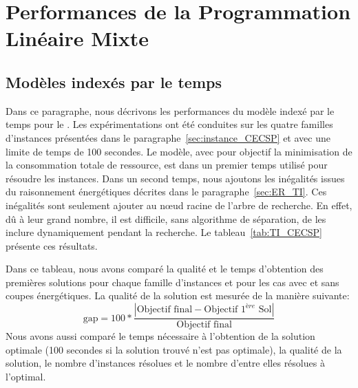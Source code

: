 \section{Performances de la Programmation Linéaire Mixte}

\subsection{Modèles indexés par le temps}
Dans ce paragraphe, nous décrivons les performances du modèle indexé
par le temps pour le \CECSP. Les expérimentations ont été conduites
sur les quatre familles d'instances présentées dans le
paragraphe~\ref{sec:instance_CECSP} et avec une limite de temps de 100
secondes. Le modèle, avec pour objectif la minimisation de la
consommation totale de ressource, est dans un premier temps utilisé
pour résoudre les instances. Dans un second temps, nous ajoutons les
inégalités issues du raisonnement énergétiques décrites dans le
paragraphe~\ref{sec:ER_TI}. Ces inégalités sont seulement ajouter au
n\oe ud racine de l'arbre de recherche. En effet, dû à leur grand
nombre, il est difficile, sans algorithme de séparation, de les
inclure dynamiquement pendant la recherche. Le
tableau~\ref{tab:TI_CECSP} présente ces résultats.

Dans ce tableau, nous avons comparé la qualité et le temps d'obtention
des premières solutions pour chaque famille d'instances et pour les
cas avec et sans coupes énergétiques. La qualité de la solution est
mesurée de la manière suivante: 
\[
  \text{gap}=100*\frac{|\text{Objectif final} - \text{Objectif } 1^{ère} \text{  Sol}|}{\text{Objectif final}}
\]
Nous avons aussi comparé le temps nécessaire à l'obtention de la
solution optimale (100 secondes si la solution trouvé n'est pas
optimale), la qualité de la solution, le nombre d'instances résolues
et le nombre d'entre elles résolues à l'optimal.

